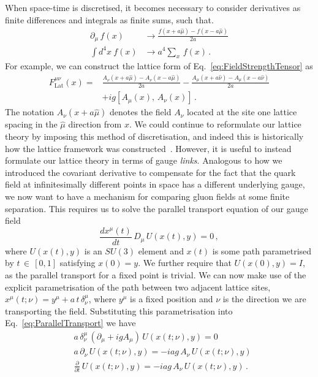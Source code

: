 When space-time is discretised, it becomes necessary to consider derivatives as finite differences and integrals as finite sums, such that.
\begin{align}
\partial_\mu\,f(x)&\rightarrow \frac{f(x+a\hat{\mu})-f(x-a\hat{\mu})}{2a}\\
\int d^4x~f(x) &\rightarrow a^4\sum_x \,f(x)\, .
\end{align}
For example, we can construct the lattice form of Eq.~\eqref{eq:FieldStrengthTensor} as
%
\begin{align}
F_{\text{Lat}}^{\mu\nu}(x) = &\frac{A_\nu(x+a\hat{\mu})-A_\nu(x-a\hat{\mu})}{2a}-\frac{A_\mu(x+a\hat{\nu})-A_\mu(x-a\hat{\nu})}{2a}\nonumber\\
&+ig[A_\mu(x),\,A_\nu(x)]\, .
\label{eq:DiscreteFST}
\end{align}
%
The notation $A_\nu(x+a\hat{\mu})$ denotes the field $A_\nu$ located at the site one lattice spacing in the $\hat{\mu}$ direction from $x$. We could continue to reformulate our lattice theory by imposing this method of discretisation, and indeed this is historically how the lattice framework was constructed~\cite{Wilson:1974sk}. However, it is useful to instead formulate our lattice theory in terms of gauge {\it links}. Analogous to how we introduced the covariant derivative to compensate for the fact that the quark field at infinitesimally different points in space has a different underlying gauge, we now want to have a mechanism for comparing gluon fields at some finite separation. This requires us to solve the parallel transport equation of our gauge field~\cite{peskin2018introduction}
%
\begin{equation}
\frac{dx^\mu(t)}{dt}\,D_\mu \,U(x(t),y)=0\, ,
\label{eq:ParallelTransport}
\end{equation}
%
where $U(x(t),y)$ is an $SU(3)$ element and $x(t)$ is some path parametrised by $t\,\in\,[0,1]$ satisfying $x(0)=y$. We further require that $U(x(0),y)=I$, as the parallel transport for a fixed point is trivial. We can now make use of the explicit parametrisation of the path between two adjacent lattice sites, $x^\mu(t;\nu) = y^\mu+a\,t\,\delta_\nu^\mu$, where $y^\mu$ is a fixed position and $\nu$ is the direction we are transporting the field. Substituting this parametrisation into Eq.~\eqref{eq:ParallelTransport} we have
\begin{align}
&a\, \delta_\nu^\mu\, (\partial_\mu + igA_\mu)\,U(x(t;\nu),y)=0\nonumber\\
&a\, \partial_\nu\, U(x(t;\nu),y) = -iag\, A_\nu\,U(x(t;\nu),y)\nonumber\\
&\frac{\partial}{\partial t}\, U(x(t;\nu),y) = -iag\,A_\nu\, U(x(t;\nu),y)\, .
\label{eq:PathOrderedDE}
\end{align}
